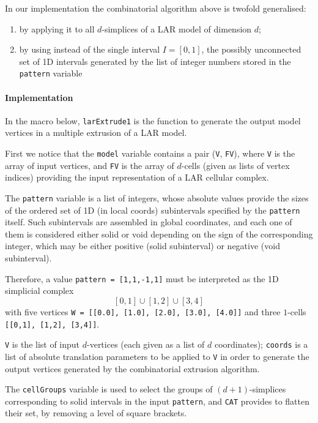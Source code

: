 \documentclass[11pt,oneside]{article}	%
\begin{document}
In our implementation the combinatorial algorithm above is twofold generalised:
\begin{enumerate}
\item by applying it to all $d$-simplices of a LAR model of dimension $d$;
\item by using instead of the single interval $I=[0,1]$, the possibly unconnected set of 1D intervals generated by the list of integer numbers stored in the \texttt{pattern} variable
\end{enumerate}

\paragraph{Implementation}
In the macro below, \texttt{larExtrude1} is the function to generate the output model vertices in a multiple extrusion of a LAR model.

First we notice that the \texttt{model} variable contains a pair (\texttt{V}, \texttt{FV}), where \texttt{V} is the array of input vertices, and \texttt{FV} is the array of $d$-cells (given as lists of vertex indices) providing the  input representation of a LAR cellular complex.

The \texttt{pattern} variable is a list of integers, whose absolute values provide the sizes of the ordered set of 1D (in local coords) subintervals specified by the \texttt{pattern} itself. Such subintervals are assembled in global coordinates, and each one of them is considered either solid or void depending on the sign of the corresponding integer, which may be either positive (solid subinterval) or negative (void subinterval).  

Therefore, a value \texttt{pattern = [1,1,-1,1]} must be interpreted as the 1D simplicial complex
\[
[0,1] \cup [1,2] \cup [3,4]
\]
with five vertices \texttt{W = [[0.0], [1.0], [2.0], [3.0], [4.0]]} and three $1$-cells \texttt{[[0,1], [1,2], [3,4]]}.

\texttt{V} is the list of input $d$-vertices (each given as a list of $d$ coordinates);
\texttt{coords} is a list of absolute translation parameters to be applied to \texttt{V} in order to generate the output vertices generated by the combinatorial extrusion algorithm.

The \texttt{cellGroups} variable is used to select the groups of $(d+1)$-simplices corresponding to solid intervals in the input \texttt{pattern}, and \texttt{CAT} provides to flatten their set, by removing a level of square brackets.
\end{document}
